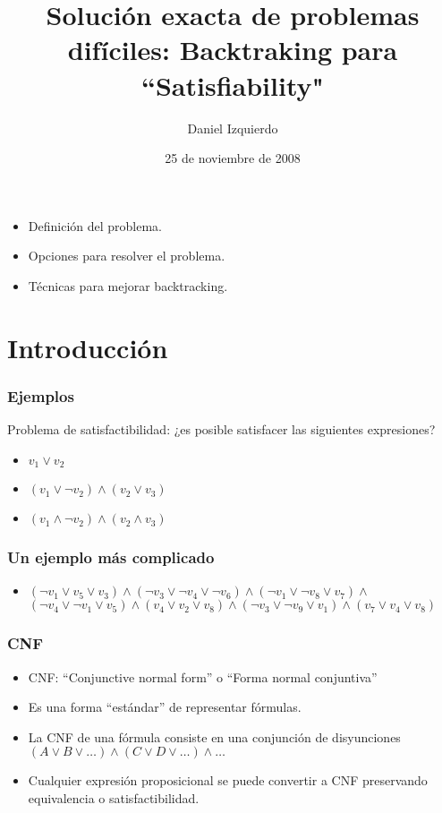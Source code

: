 \documentclass{beamer}
\begin{document}
\title{Solución exacta de problemas difíciles: Backtraking para ``Satisfiability"}
\author{Daniel Izquierdo}
\date{25 de noviembre de 2008}

\frame{\titlepage}

\section[Contenido]{}
\frame
{
  \begin{itemize}
  \item Definición del problema.
  \item Opciones para resolver el problema.
  \item Técnicas para mejorar backtracking.
  \end{itemize}
}

\section{Introducción}

\frame
{
  \frametitle{Ejemplos}

  Problema de satisfactibilidad: ¿es posible satisfacer las siguientes expresiones?

  \begin{itemize}
  \item $v_1 \vee v_2$
  \item $(v_1 \vee \neg v_2) \wedge (v_2 \vee v_3)$
  \item $(v_1 \wedge \neg v_2) \wedge (v_2 \wedge v_3)$
  \end{itemize}
}

\frame
{
  \frametitle{Un ejemplo más complicado}

  \begin{itemize}
  \item $(\neg v_{1} \vee v_5 \vee v_3) \wedge (\neg v_{3} \vee \neg v_{4} \vee \neg v_{6}) \wedge (\neg v_{1} \vee \neg v_{8} \vee v_{7}) \wedge$
        $(\neg v_{4} \vee \neg v_{1} \vee v_{5}) \wedge (v_4 \vee v_2 \vee v_8) \wedge (\neg v_3 \vee \neg v_9 \vee v_1) \wedge (v_7 \vee v_4 \vee v_8)$
  \end{itemize}
}

\frame
{
  \frametitle{CNF}

  \begin{itemize}
  \item CNF: ``Conjunctive normal form'' o ``Forma normal conjuntiva''
  \item Es una forma ``estándar'' de representar fórmulas.
  \item La CNF de una fórmula consiste en una conjunción de disyunciones $(A \vee B \vee \ldots) \wedge (C \vee D \vee \ldots) \wedge \ldots$
  \item Cualquier expresión proposicional se puede convertir a CNF preservando
        equivalencia o satisfactibilidad.
  \end{itemize}
}
\end{document}
